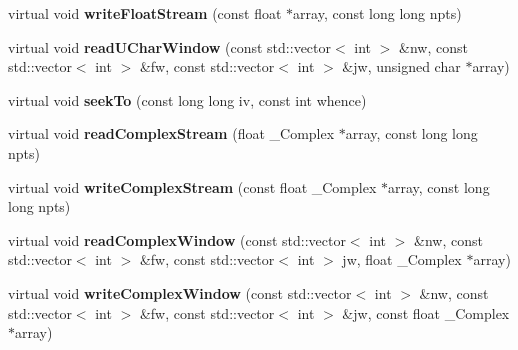 \begin{DoxyCompactItemize}
\item 
\mbox{\label{class_s_e_p_1_1generic_reg_file_aec31ea2cca3d6e5b346b5b597e841657}} 
virtual void {\bfseries write\+Float\+Stream} (const float $\ast$array, const long long npts)
\item 
\mbox{\label{class_s_e_p_1_1generic_reg_file_a28605de49d107f01bc3c06439d47d4b9}} 
virtual void {\bfseries read\+U\+Char\+Window} (const std\+::vector$<$ int $>$ \&nw, const std\+::vector$<$ int $>$ \&fw, const std\+::vector$<$ int $>$ \&jw, unsigned char $\ast$array)
\item 
\mbox{\label{class_s_e_p_1_1generic_reg_file_ae93b5bb7a8e57b9ba59f5f84e9bc005c}} 
virtual void {\bfseries seek\+To} (const long long iv, const int whence)
\item 
\mbox{\label{class_s_e_p_1_1generic_reg_file_a3b1445ba699dc28b9899c3cf6f531554}} 
virtual void {\bfseries read\+Complex\+Stream} (float \+\_\+\+Complex $\ast$array, const long long npts)
\item 
\mbox{\label{class_s_e_p_1_1generic_reg_file_aa87148585ea2cc82daf8cbe867d68ddc}} 
virtual void {\bfseries write\+Complex\+Stream} (const float \+\_\+\+Complex $\ast$array, const long long npts)
\item 
\mbox{\label{class_s_e_p_1_1generic_reg_file_a530ed8e906968d229e2cfde4a0499dbe}} 
virtual void {\bfseries read\+Complex\+Window} (const std\+::vector$<$ int $>$ \&nw, const std\+::vector$<$ int $>$ \&fw, const std\+::vector$<$ int $>$ jw, float \+\_\+\+Complex $\ast$array)
\item 
\mbox{\label{class_s_e_p_1_1generic_reg_file_af2c8efc1c2f575fc0287a414dd1e338f}} 
virtual void {\bfseries write\+Complex\+Window} (const std\+::vector$<$ int $>$ \&nw, const std\+::vector$<$ int $>$ \&fw, const std\+::vector$<$ int $>$ \&jw, const float \+\_\+\+Complex $\ast$array)
\item 
\mbox{\label{class_s_e_p_1_1generic_reg_file_afe4eb84f8cd5c1fb791a6b53a20ac175}} 

\end{DoxyCompactItemize}
